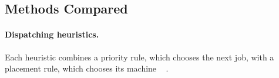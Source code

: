 \documentclass[12pt]{article}
\providecommand{\DIFaddtex}[1]{{\color{red}#1}} %
\providecommand{\DIFdeltex}[1]{} %
\providecommand{\DIFaddbegin}{} %
\providecommand{\DIFaddend}{} %
\providecommand{\DIFdelbegin}{} %
\providecommand{\DIFdelend}{} %
\providecommand{\DIFadd}[1]{\texorpdfstring{\DIFaddtex{#1}}{#1}} %
\providecommand{\DIFdel}[1]{\texorpdfstring{\DIFdeltex{#1}}{}} %
\providecommand{\DIFscaledelfig}{0.5}
\newlength{\DIFdelgraphicswidth} %
\newlength{\DIFdelgraphicsheight} %
\providecommand{\DIFaddincludegraphics}[2][]{{\color{blue}\fbox{\DIFOincludegraphics[#1]{#2}}}} %
\providecommand{\DIFdelincludegraphics}[2][]{%
\sbox{\DIFdelgraphicsbox}{\DIFOincludegraphics[#1]{#2}}%
\settoboxwidth{\DIFdelgraphicswidth}{\DIFdelgraphicsbox} %
\settoboxtotalheight{\DIFdelgraphicsheight}{\DIFdelgraphicsbox} %
\scalebox{\DIFscaledelfig}{%
\parbox[b]{\DIFdelgraphicswidth}{\usebox{\DIFdelgraphicsbox}\\[-\baselineskip] \rule{\DIFdelgraphicswidth}{0em}}\llap{\resizebox{\DIFdelgraphicswidth}{\DIFdelgraphicsheight}{%
\setlength{\unitlength}{\DIFdelgraphicswidth}%
\begin{picture}(1,1)%
\thicklines\linethickness{2pt} %
{\color[rgb]{1,0,0}\put(0,0){\framebox(1,1){}}}%
{\color[rgb]{1,0,0}\put(0,0){\line( 1,1){1}}}%
{\color[rgb]{1,0,0}\put(0,1){\line(1,-1){1}}}%
\end{picture}%
}\hspace*{3pt}}} %
} %
\DeclareRobustCommand{\DIFaddbegin}{\DIFOaddbegin \let\includegraphics\DIFaddincludegraphics} %
\DeclareRobustCommand{\DIFaddend}{\DIFOaddend \let\includegraphics\DIFOincludegraphics} %
\DeclareRobustCommand{\DIFdelbegin}{\DIFOdelbegin \let\includegraphics\DIFdelincludegraphics} %
\DeclareRobustCommand{\DIFdelend}{\DIFOaddend \let\includegraphics\DIFOincludegraphics} %
\begin{document}
\DIFdelbegin 
\addtocounter{subsubsection}{-1}%
\paragraph{\DIFdel{Dispatching Heuristics}}%
\addtocounter{paragraph}{-1}%
\DIFdel{. }\DIFdelend \DIFaddbegin \subsection{\DIFadd{Methods Compared}}\label{sec:baselines}
\paragraph{\DIFadd{Dispatching heuristics.}} \DIFaddend Each heuristic combines a priority rule\DIFdelbegin \DIFdel{to choose }\DIFdelend \DIFaddbegin \DIFadd{, which chooses }\DIFaddend the next job, \DIFdelbegin \DIFdel{and }\DIFdelend \DIFaddbegin \DIFadd{with }\DIFaddend a placement rule\DIFdelbegin \DIFdel{to choose the next machine }\DIFdelend \DIFaddbegin \DIFadd{, which chooses its machine \mbox{%
\cite{pinedo2016scheduling}}\hskip0pt%
}\DIFaddend .
\end{document}
